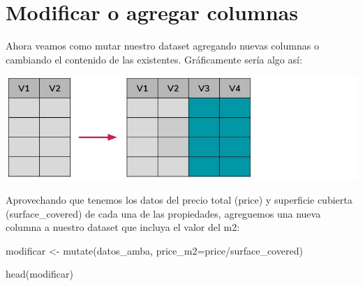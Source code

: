 \documentclass[
  spanish,
]{book}
\newenvironment{Shaded}{\begin{snugshade}}{\end{snugshade}}
\newcommand{\AttributeTok}[1]{\textcolor[rgb]{0.77,0.63,0.00}{#1}}
\newcommand{\FunctionTok}[1]{\textcolor[rgb]{0.00,0.00,0.00}{#1}}
\newcommand{\NormalTok}[1]{#1}
\newcommand{\OtherTok}[1]{\textcolor[rgb]{0.56,0.35,0.01}{#1}}
\newcommand{\SpecialCharTok}[1]{\textcolor[rgb]{0.00,0.00,0.00}{#1}}
\begin{document}
\hypertarget{modificar-o-agregar-columnas}{%
\section{Modificar o agregar columnas}\label{modificar-o-agregar-columnas}}

Ahora veamos como mutar nuestro dataset agregando nuevas columnas o cambiando el contenido de las existentes. Gráficamente sería algo así:

\includegraphics{images/tidyverse_modificar.jpg}

Aprovechando que tenemos los datos del precio total (price) y superficie cubierta (surface\_covered) de cada una de las propiedades, agreguemos una nueva columna a nuestro dataset que incluya el valor del m2:

\begin{Shaded}
\begin{Highlighting}[]
\NormalTok{modificar }\OtherTok{\textless{}{-}} \FunctionTok{mutate}\NormalTok{(datos\_amba, }\AttributeTok{price\_m2=}\NormalTok{price}\SpecialCharTok{/}\NormalTok{surface\_covered)}

\FunctionTok{head}\NormalTok{(modificar)}
\end{Highlighting}
\end{Shaded}
\end{document}
